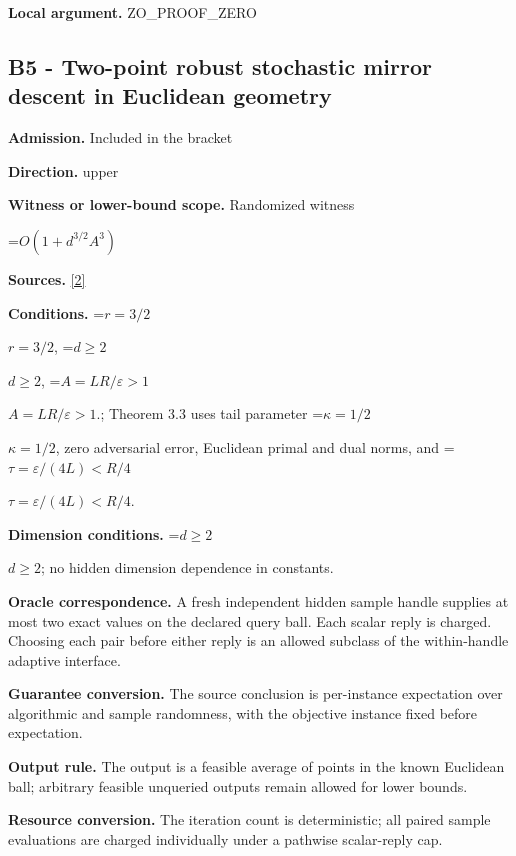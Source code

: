 \documentclass[10pt,a4paper]{article}
\newcommand{\AtlasMath}[1]{\par\begingroup\centering\setbox0=\hbox{$\displaystyle #1$}\ifdim\wd0>1.4\linewidth\typeout{ATLAS WIDE FORMULA: \the\wd0}\fi\ifdim\wd0>\linewidth\resizebox{\linewidth}{!}{\box0}\else\box0\fi\par\endgroup}
\newcommand{\AtlasInlineMath}[1]{\begingroup\setbox0=\hbox{$#1$}\ifdim\wd0>.4\linewidth\endgroup\AtlasMath{#1}\else\endgroup$#1$\fi}
\begin{document}
\textbf{Local argument.} ZO\_PROOF\_ZERO



\subsection{B5 - Two-point robust stochastic mirror descent in Euclidean geometry}


\textbf{Admission.} Included in the bracket



\textbf{Direction.} upper



\textbf{Witness or lower-bound scope.} Randomized witness



\AtlasMath{O(1+d^{3/2}A^3)}


\textbf{Sources.} \href{https://arxiv.org/abs/2304.02442v3}{[2]}



\textbf{Conditions.} \AtlasInlineMath{r=3/2}, \AtlasInlineMath{d\ge2}, \AtlasInlineMath{A=LR/\varepsilon>1}.; Theorem 3.3 uses tail parameter \AtlasInlineMath{\kappa=1/2}, zero adversarial error, Euclidean primal and dual norms, and \AtlasInlineMath{\tau=\varepsilon/(4L)<R/4}.



\textbf{Dimension conditions.} \AtlasInlineMath{d\ge2}; no hidden dimension dependence in constants.



\textbf{Oracle correspondence.} A fresh independent hidden sample handle supplies at most two exact values on the declared query ball. Each scalar reply is charged. Choosing each pair before either reply is an allowed subclass of the within-handle adaptive interface.



\textbf{Guarantee conversion.} The source conclusion is per-instance expectation over algorithmic and sample randomness, with the objective instance fixed before expectation.



\textbf{Output rule.} The output is a feasible average of points in the known Euclidean ball; arbitrary feasible unqueried outputs remain allowed for lower bounds.



\textbf{Resource conversion.} The iteration count is deterministic; all paired sample evaluations are charged individually under a pathwise scalar-reply cap.
\end{document}
